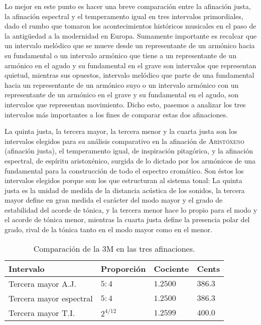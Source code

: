 \documentclass[a4paper,12pt]{article}
\begin{document}
\begin{multicols}{2}
  Lo mejor en este punto es hacer una breve comparación entre la afinación justa, la afinación espectral y el temperamento igual en tres intervalos primordiales, dado el rumbo que tomaron los acontecimientos históricos musicales en el paso de la antigüedad a la modernidad en Europa. Sumamente importante es recalcar que un intervalo melódico que se mueve desde un representante de un armónico hacia su fundamental o un intervalo armónico que tiene a un representante de un armónico en el agudo y su fundamental en el grave son intervalos que representan quietud, mientras sus opuestos, intervalo melódico que parte de una fundamental hacia un representante de un armónico suyo o un intervalo armónico con un representante de un armónico en el grave y su fundamental en el agudo, son intervalos que representan movimiento. Dicho esto, pasemos a analizar los tres intervalos más importantes a los fines de comparar estas dos afinaciones.

  La quinta justa, la tercera mayor, la tercera menor y la cuarta justa son los intervalos elegidos para su análisis comparativo en la afinación de \textsc{Aristóxeno} (afinación justa), el temperamento igual, de inspiración pitagórica, y la afinación espectral, de espíritu aristoxénico, surgida de lo dictado por los armónicos de una fundamental para la construcción de todo el espectro cromático. Son éstos los intervalos elegidos porque son los que estructuran al sistema tonal: La quinta justa es la unidad de medida de la distancia acústica de los sonidos, la tercera mayor define en gran medida el carácter del modo mayor y el grado de estabilidad del acorde de tónica, y la tercera menor hace lo propio para el modo y el acorde de tónica menor, mientras la cuarta justa define la presencia polar del  grado, rival de la tónica tanto en el modo mayor como en el menor.
\end{multicols}

  \begin{table}[ht]
  \centering
  \caption{Comparación de la 3M en las tres afinaciones.}\label{tab:3M}
  \begin{tabular}{@{}llll@{}}
  \toprule
  Intervalo               & Proporción  & Cociente  & Cents   \\ \midrule
  Tercera mayor A.J.      & $5:4$       & $1.2500$  & $386.3$ \\
  Tercera mayor espectral & $5:4$       & $1.2500$  & $386.3$ \\
  Tercera mayor T.I.      & $2^{4/12}$  & $1.2599$  & $400.0$ \\ \bottomrule
  \end{tabular}
  \end{table}
\end{document}
